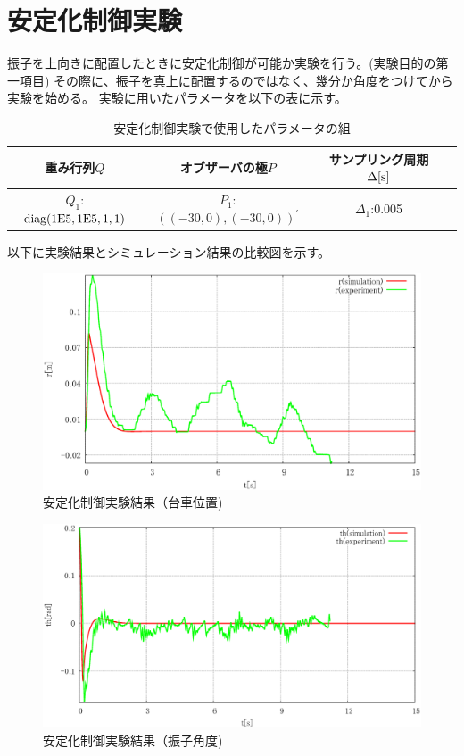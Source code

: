 \section{安定化制御実験}
	振子を上向きに配置したときに安定化制御が可能か実験を行う。(実験目的の第一項目)
	その際に、振子を真上に配置するのではなく、幾分か角度をつけてから実験を始める。
	実験に用いたパラメータを以下の表に示す。
	\begin{table}[htb]
		\begin{center}
			\caption{安定化制御実験で使用したパラメータの組}
			\medskip
			
			\begin{tabular}{|c|c|c|c|}\hline
				重み行列$Q$ & オブザーバの極$P$ & サンプリング周期$\Delta[\rm{s}]$ \\ \hline\hline
				$Q_1$:$\rm{diag}(1E5,1E5,1,1)$ & $P_1$:$((-30,0),(-30,0))^{'}$ & $\Delta_1$:0.005 \\ \hline
			\end{tabular}
		\end{center}
		\label{table:huriage_control}
	\end{table}
	以下に実験結果とシミュレーション結果の比較図を示す。
	\begin{figure}[H]
		\centering
		\includegraphics[width=0.8\linewidth]{gazo/experiment_control_R.eps}
		\caption{安定化制御実験結果（台車位置)}
		\label{image:experiment_control_R}
	\end{figure}
	\begin{figure}[H]
		\centering
		\includegraphics[width=0.8\linewidth]{gazo/experiment_control_TH.eps}
		\caption{安定化制御実験結果（振子角度)}
		\label{image:experiment_control_TH}
	\end{figure}
